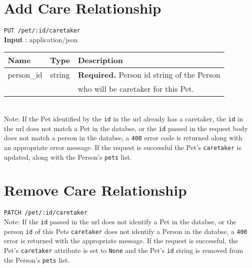 \documentclass{article}
\begin{document}
\section*{Add Care Relationship}
\texttt{PUT /pet/:id/caretaker} \\
\textbf{Input} : application/json \\
\begin{tabular}{| l | l | l |}
	\hline
	\textbf{Name} & \textbf{Type} & \textbf{Description} \\
	\hline
	person\_id   & string         & \textbf{Required.} Person id string of the Person \\
		     &                & who will be caretaker for this Pet. \\
	\hline
\end{tabular} \\
Note: If the Pet identified by the \texttt{id} in the url already has a caretaker,
the \texttt{id} in the url does not match a Pet in the databse, or the \texttt{id}
passed in the request body does not match a person in the databse, a \texttt{400} error code
is returned along with an appropriate error message. If the request is successful the Pet's
\texttt{caretaker} is updated, along with the Person's \texttt{pets} list.

\section*{Remove Care Relationship}
\texttt{PATCH /pet/:id/caretaker} \\
Note: If the \texttt{id} passed in the url does not identify a Pet in the databse,
or the person \texttt{id} of this Pets \texttt{caretaker} does not identify a Person
in the databse, a \texttt{400} error is returned with the appropriate message.
If the request is successful, the Pet's \texttt{caretaker} attribute is set to
\texttt{None} and the Pet's \texttt{id} string is removed from the Person's
\texttt{pets} list.
\end{document}
